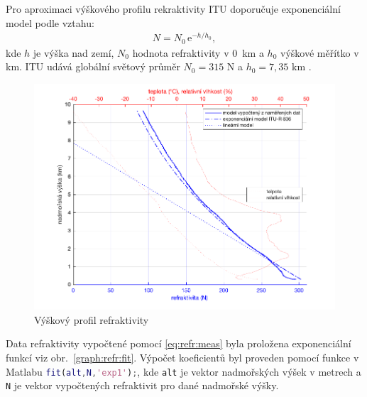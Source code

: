 \documentclass[twoside]{ctuthesis}
\newcommand{\mt}[1]{\text{#1}}
\theoremstyle{plain}
\theoremstyle{definition}
\theoremstyle{note}
\begin{document}
	Pro aproximaci výškového profilu rekraktivity ITU doporučuje \cite{ITU:refrac} exponenciální model podle vztahu:
	\begin{align}
		N = N_\mt{0}\,\mt{e}^{-h/h_\mt{0}},
		\label{eq:refr:approx}
	\end{align}
	kde $h$ je výška nad zemí, $N_\mt{0}$ hodnota refraktivity v 0~km a $h_\mt{0}$ výškové měřítko v km. ITU udává globální světový průměr $N_\mt{0} = 315 \mt{ N}$ a $h_\text{0} = 7{,}35 \mt{ km}$ \cite{zaklady:sireni:vln}.
	\begin{figure}[hbtp]
		\centering
		\includegraphics[width=.7\textwidth]{Graphs/refractivity_exp_lin_meas_hum.pdf}
		\caption{Výškový profil refraktivity}
		\label{graph:refr}
	\end{figure}

	Data refraktivity vypočtené pomocí \eqref{eq:refr:meas} byla proložena exponenciální funkcí viz obr.~\ref{graph:refr:fit}. Výpočet koeficientů byl proveden pomocí funkce v Matlabu \lstinline[language=Matlab]|fit(alt,N,'exp1');|, kde \lstinline|alt| je vektor nadmořských výšek v metrech a \lstinline|N| je vektor vypočtených refraktivit pro dané nadmořské výšky.
\end{document}
